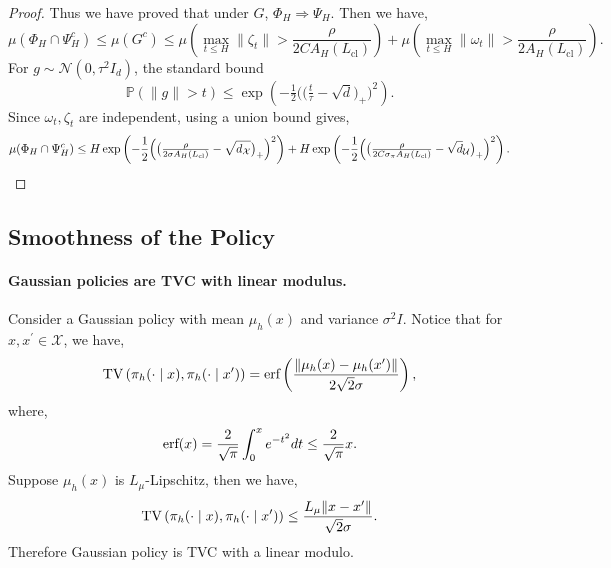 \documentclass{article}
\let\oldparagraph\paragraph
\renewcommand{\paragraph}[1]{\oldparagraph{#1.}}
\begin{document}
\begin{proof}
Thus we have proved that under $G$, $\Phi_H\Rightarrow \Psi_H$. Then we have,
\begin{equation*}
    \mu(\Phi_H\cap \Psi_H^c)\leq \mu(G^c)\leq \mu(\max_{t\leq H}\|\zeta_t\|> \frac{\rho}{2CA_H(L_{\text{cl}})})+\mu(\max_{t\leq H}\|\omega_t\|> \frac{\rho}{2A_H(L_{\text{cl}})}).
\end{equation*}
For $g\sim\mathcal N(0,\tau^2 I_d)$, the standard bound
\begin{equation*}
\mathbb P(\|g\|>t)\le \exp\left(-\tfrac12\big(\big(\tfrac{t}{\tau}-\sqrt d\big)_+\big)^2\right).
\end{equation*}
Since $\omega_t, \zeta_t$ are independent, using a union bound gives,
\begin{equation*}
    \mu(\Phi_H\cap \Psi_H^c)\leq H\exp\left(
-\frac12\Big(\big(\tfrac{\rho}{2\sigma A_H(L_{\mathrm{cl}})}-\sqrt {d_{\mathcal X}}\big)_+\Big)^2
\right)
+
H\exp\left(
-\frac12\Big(\big(\tfrac{\rho}{2C\sigma_\pi A_H(L_{\mathrm{cl}})}-\sqrt d_{\mathcal U}\big)_+\Big)^2
\right). \qedhere
\end{equation*}
\end{proof}









\subsection{Smoothness of the Policy}\label{sec:discussion_on_TVC}
\paragraph{Gaussian policies are TVC with linear modulus}
Consider a Gaussian policy with mean $\mu_h(x)$ and variance $\sigma^2 I$. Notice that for $x, x^\prime \in \mathcal X$, we have,
\begin{equation*}
    \textnormal{TV}\left(\pi_h(\cdot \mid x),\pi_h(\cdot \mid x^\prime)\right)=\textnormal{erf}\left(\frac{\|\mu_h(x)-\mu_h(x^\prime)\|}{2\sqrt 2 \sigma}\right),
\end{equation*}
where,
\begin{equation*}
    \textnormal{erf}(x)=\frac{2}{\sqrt \pi}\int_0^x e^{-t^2}dt\leq \frac{2}{\sqrt \pi}x.
\end{equation*}
Suppose $\mu_h(x)$ is $L_\mu$-Lipschitz, then we have,
\begin{equation*}
     \textnormal{TV}\left(\pi_h(\cdot \mid x),\pi_h(\cdot \mid x^\prime)\right)\leq \frac{L_\mu\|x-x^\prime\|}{\sqrt 2\sigma}.
\end{equation*}
Therefore Gaussian policy is TVC with a linear modulo.
\end{document}
